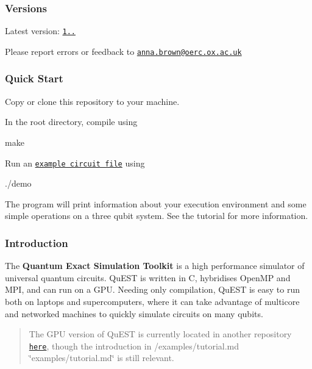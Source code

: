\subsubsection*{Versions}

Latest version\+: \href{https://github.com/aniabrown/QuEST/releases/tag/v1.0.0}{\tt 1..}

Please report errors or feedback to \href{mailto:anna.brown@oerc.ox.ac.uk}{\tt anna.\+brown@oerc.\+ox.\+ac.\+uk}

\subsubsection*{Quick Start}

Copy or clone this repository to your machine.

In the root directory, compile using


\begin{DoxyCode}
make
\end{DoxyCode}


Run an \href{tutorialExample.c}{\tt example circuit file} using


\begin{DoxyCode}
./demo
\end{DoxyCode}


The program will print information about your execution environment and some simple operations on a three qubit system. See the tutorial for more information.

\subsubsection*{Introduction}

The {\bfseries Quantum Exact Simulation Toolkit} is a high performance simulator of universal quantum circuits. Qu\+E\+ST is written in C, hybridises Open\+MP and M\+PI, and can run on a G\+PU. Needing only compilation, Qu\+E\+ST is easy to run both on laptops and supercomputers, where it can take advantage of multicore and networked machines to quickly simulate circuits on many qubits.

\begin{quote}
The G\+PU version of Qu\+E\+ST is currently located in another repository \href{https://github.com/aniabrown/QuEST_GPU}{\tt here}, though the introduction in /examples/tutorial.md \char`\"{}examples/tutorial.\+md\char`\"{} is still relevant. \end{quote}



